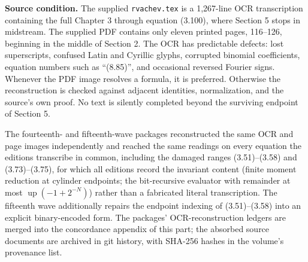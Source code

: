 \documentclass[11pt,oneside]{article}
\numberwithin{equation}{section}
\theoremstyle{definition}
\theoremstyle{remark}
\newcommand{\Up}{\operatorname{up}}
\begin{document}
\begin{scopebox}
\textbf{Source condition.}
The supplied \texttt{rvachev.tex} is a 1,267-line OCR transcription containing
the full Chapter 3 through equation (3.100), where Section 5 stops in midstream.
The supplied PDF contains only eleven printed pages, 116--126, beginning in the
middle of Section 2.  The OCR has predictable defects: lost superscripts,
confused Latin and Cyrillic glyphs, corrupted binomial coefficients, equation
numbers such as ``(8.85)'', and occasional reversed Fourier signs.  Whenever the
PDF image resolves a formula, it is preferred.  Otherwise the reconstruction is
checked against adjacent identities, normalization, and the source's own proof.
No text is silently completed beyond the surviving endpoint of Section 5.

The fourteenth- and fifteenth-wave packages reconstructed the same OCR and
page images independently and reached the same readings on every equation the
editions transcribe in common, including the damaged ranges (3.51)--(3.58) and
(3.73)--(3.75), for which all editions record the invariant content (finite
moment reduction at cylinder endpoints; the bit-recursive evaluator with
remainder at most $\Up(-1+2^{-N})$) rather than a fabricated literal
transcription.  The fifteenth wave additionally repairs the endpoint indexing
of (3.51)--(3.58) into an explicit binary-encoded form.  The packages'
OCR-reconstruction ledgers are merged into the concordance appendix of this
part; the absorbed source documents are archived in git history, with
SHA-256 hashes in the volume's provenance list.


\end{scopebox}
\end{document}

